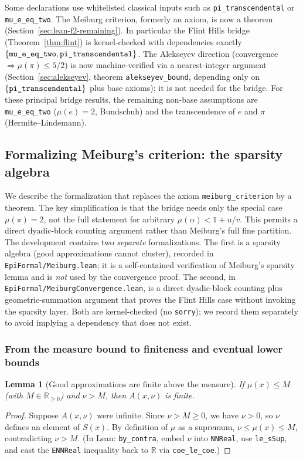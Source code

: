 \documentclass[11pt]{amsart}
\newtheorem{lemma}[theorem]{Lemma}
\theoremstyle{definition}
\theoremstyle{remark}
\numberwithin{equation}{section}
\newcommand{\R}{\mathbb{R}}
\newcommand{\irr}{\mu}
\newcommand{\ee}{e}
\begin{document}
Some declarations use whitelisted classical inputs such
as \texttt{pi\_transcendental} or \texttt{mu\_e\_eq\_two}.
The Meiburg criterion, formerly an axiom, is now a theorem (Section~\ref{sec:lean-f2-remaining}). In particular the Flint Hills bridge (Theorem~\ref{thm:flint}) is kernel-checked with dependencies exactly $\{\texttt{mu\_\allowbreak{}e\_\allowbreak{}eq\_\allowbreak{}two},\texttt{pi\_\allowbreak{}transcendental}\}$. The Alekseyev direction (convergence $\Rightarrow\irr(\pi)\le5/2$) is now machine-verified via a nearest-integer argument (Section~\ref{sec:alekseyev}, theorem \texttt{alekseyev\_\allowbreak{}bound}, depending only on $\{\texttt{pi\_\allowbreak{}transcendental}\}$ plus base axioms); it is not needed for the bridge. For these principal bridge results, the remaining non-base assumptions are \texttt{mu\_\allowbreak{}e\_\allowbreak{}eq\_\allowbreak{}two} ($\irr(\ee)=2$, Bundschuh) and the transcendence of $\ee$ and $\pi$ (Hermite--Lindemann).

\subsection{Formalizing Meiburg's criterion: the sparsity algebra}\label{sec:lean-f2}

We describe the formalization that replaces the axiom \texttt{meiburg\_criterion} by a theorem. The key simplification is that the bridge needs only the special case $\irr(\pi)=2$, not the full statement for arbitrary $\irr(\alpha)<1+u/v$. This permits a direct dyadic-block counting argument rather than Meiburg's full fine partition. The development contains two \emph{separate} formalizations. The first is a sparsity algebra (good approximations cannot cluster), recorded in \texttt{EpiFormal/\allowbreak{}Meiburg.lean}; it is a self-contained verification of Meiburg's sparsity lemma and is \emph{not} used by the convergence proof. The second, in \texttt{EpiFormal/\allowbreak{}MeiburgConvergence.lean}, is a direct dyadic-block counting plus geometric-summation argument that proves the Flint Hills case without invoking the sparsity layer. Both are kernel-checked (no \texttt{sorry}); we record them separately to avoid implying a dependency that does not exist.

\subsubsection{From the measure bound to finiteness and eventual lower bounds}

\begin{lemma}[Good approximations are finite above the measure]\label{lem:f2-finite}
If $\irr(x)\le M$ (with $M\in\R_{\ge0}$) and $\nu>M$, then $A(x,\nu)$ is finite.
\end{lemma}
\begin{proof}
Suppose $A(x,\nu)$ were infinite. Since $\nu>M\ge0$, we have $\nu>0$, so $\nu$ defines an element of $S(x)$. By definition of $\irr$ as a supremum, $\nu\le\irr(x)\le M$, contradicting $\nu>M$. (In Lean: \texttt{by\_contra}, embed $\nu$ into \texttt{NNReal}, use \texttt{le\_sSup}, and cast the \texttt{ENNReal} inequality back to $\R$ via \texttt{coe\_le\_coe}.)
\end{proof}
\end{document}
